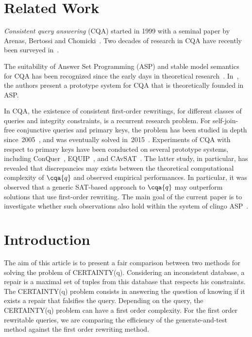 \documentclass[acmsmall]{acmart}
\begin{document}
\begin{CCSXML}
\newpage

\section{Related Work}
\emph{Consistent query answering} (CQA) started in 1999 with a seminal paper by Arenas, Bertossi and Chomicki~\cite{DBLP:conf/pods/ArenasBC99}.
Two decades of research in CQA have recently been surveyed in~\cite{DBLP:conf/pods/Bertossi19,DBLP:journals/sigmod/Wijsen19}. 

The suitability of Answer Set Programming (ASP) and stable model semantics for CQA has been recognized since the early days in theoretical research~\cite{DBLP:journals/tplp/ArenasBC03,DBLP:journals/tkde/GrecoGZ03}.
In~\cite{DBLP:journals/dke/MarileoB10}, the authors present a prototype system for CQA that is theoretically founded in ASP.

In CQA, the existence of consistent first-order rewritings, for different classes of queries and integrity constraints, is a recurrent research problem.
For self-join-free conjunctive queries and primary keys, the problem has been studied in depth since~2005~\cite{DBLP:conf/icdt/FuxmanM05,DBLP:journals/jcss/FuxmanM07}, and was eventually solved in~2015~\cite{DBLP:conf/pods/KoutrisW15,DBLP:journals/tods/KoutrisW17}.
Experiments of CQA with respect to primary keys have been conducted on several prototype systems, including ConQuer~\cite{DBLP:conf/sigmod/FuxmanFM05}, EQUIP~\cite{DBLP:journals/pvldb/KolaitisPT13}, and CAvSAT~\cite{DBLP:conf/sat/DixitK19}.
The latter study, in particular, has revealed that discrepancies may exists between the theoretical computational complexity of $\cqa{q}$ and observed empirical performances. 
In particular, it was observed that a generic SAT-based approach to $\cqa{q}$ may outperform solutions that use first-order rewriting.
The main goal of the current paper is to investigate whether such observations also hold within the system of clingo ASP~\cite{DBLP:conf/lpnmr/GebserKKS11,DBLP:journals/corr/GebserKKS14}.

\section{Introduction}
The aim of this article is to present a fair comparison between two methods for
solving the problem of CERTAINTY(q). Considering an inconsistent database, a
repair is a maximal set of tuples from this database that respects his
constraints. The CERTAINTY(q) problem consists in answering the question of
knowing if it exists a repair that falsifies the query. Depending on the query,
the CERTAINTY(q) problem can have a first order complexity. For the first order
rewritable queries, we are comparing the efficiency of the generate-and-test
method against the first order rewriting method.


\end{CCSXML}
\end{document}

